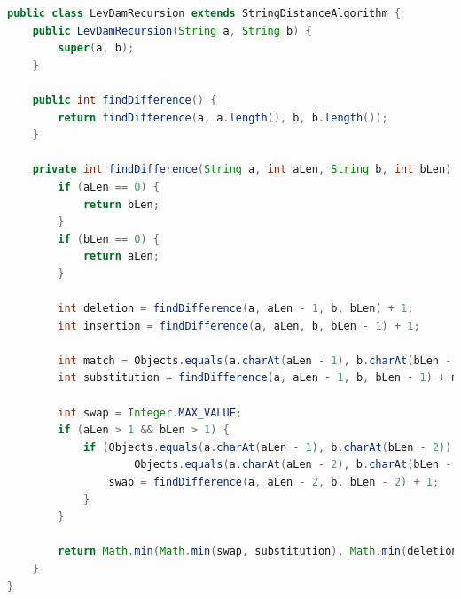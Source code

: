 \documentclass[12pt]{report}
\begin{document}
    \begin{lstlisting}[label=code:levDamRecursion,caption=Метод для нахождения расстояния Дамерау-Левенштейна
    рекурсивно,language=java]
public class LevDamRecursion extends StringDistanceAlgorithm {
    public LevDamRecursion(String a, String b) {
        super(a, b);
    }

    public int findDifference() {
        return findDifference(a, a.length(), b, b.length());
    }

    private int findDifference(String a, int aLen, String b, int bLen) {
        if (aLen == 0) {
            return bLen;
        }
        if (bLen == 0) {
            return aLen;
        }

        int deletion = findDifference(a, aLen - 1, b, bLen) + 1;
        int insertion = findDifference(a, aLen, b, bLen - 1) + 1;

        int match = Objects.equals(a.charAt(aLen - 1), b.charAt(bLen - 1)) ? 0 : 1;
        int substitution = findDifference(a, aLen - 1, b, bLen - 1) + match;

        int swap = Integer.MAX_VALUE;
        if (aLen > 1 && bLen > 1) {
            if (Objects.equals(a.charAt(aLen - 1), b.charAt(bLen - 2)) &&
                    Objects.equals(a.charAt(aLen - 2), b.charAt(bLen - 1))) {
                swap = findDifference(a, aLen - 2, b, bLen - 2) + 1;
            }
        }

        return Math.min(Math.min(swap, substitution), Math.min(deletion, insertion));
    }
}
    \end{lstlisting}
\end{document}
